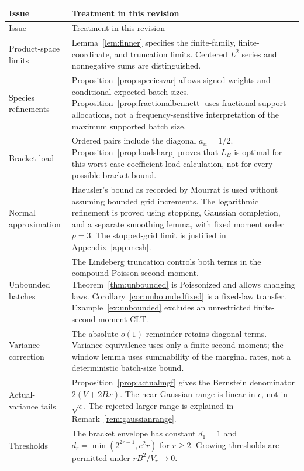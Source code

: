 \documentclass[11pt]{article}
\numberwithin{equation}{section}
\theoremstyle{definition}
\theoremstyle{remark}
\begin{document}
\renewcommand{\arraystretch}{1.14}
\begin{longtable}{@{}>{\raggedright\arraybackslash}p{}>{\raggedright\arraybackslash}p{}@{}}
\toprule
Issue & Treatment in this revision\\
\midrule
\endfirsthead
\toprule
Issue & Treatment in this revision\\
\midrule
\endhead
\bottomrule
\endfoot
Product-space limits & Lemma~\ref{lem:finner} specifies the finite-family,
finite-coordinate, and truncation limits. Centered $L^2$ series and nonnegative
sums are distinguished.\\
Species refinements & Proposition~\ref{prop:speciesvar} allows signed weights
and conditional expected batch sizes. Proposition~\ref{prop:fractionalbennett}
uses fractional support allocations, not a frequency-sensitive interpretation
of the maximum supported batch size.\\
Bracket load & Ordered pairs include the diagonal $a_{ii}=1/2$.
Proposition~\ref{prop:loadsharp} proves that $L_B$ is optimal for this
worst-case coefficient-load calculation, not for every possible bracket bound.\\
Normal approximation & Haeusler's bound as recorded by Mourrat is used without
assuming bounded grid increments. The logarithmic refinement is proved using
stopping, Gaussian completion, and a separate smoothing lemma, with fixed
moment order $p=3$. The stopped-grid limit is justified in Appendix~\ref{app:mesh}.\\
Unbounded batches & The Lindeberg truncation controls both terms in the
compound-Poisson second moment. Theorem~\ref{thm:unbounded} is Poissonized and
allows changing laws. Corollary~\ref{cor:unboundedfixed} is a fixed-law transfer.
Example~\ref{ex:unbounded} excludes an unrestricted finite-second-moment CLT.\\
Variance correction & The absolute $o(1)$ remainder retains diagonal terms.
Variance equivalence uses only a finite second moment; the window lemma uses
summability of the marginal rates, not a deterministic batch-size bound.\\
Actual-variance tails & Proposition~\ref{prop:actualmgf} gives the Bernstein
denominator $2(V+2Bx)$. The near-Gaussian range is linear in $\epsilon$,
not in $\sqrt\epsilon$. The rejected larger range is explained in
Remark~\ref{rem:gaussianrange}.\\
Thresholds & The bracket envelope has constant
$d_1=1$ and $d_r=\min(2^{2r-1},e^2r)$ for $r\ge2$.
Growing thresholds are permitted under $rB^2/V_r\to0$.

\end{longtable}
\end{document}
